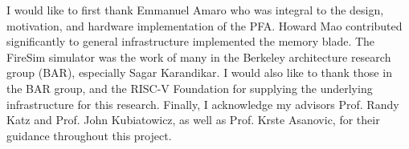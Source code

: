 I would like to first thank Emmanuel Amaro who was integral to the design,
motivation, and hardware implementation of the PFA. Howard Mao contributed
significantly to general infrastructure implemented the memory blade. The
FireSim simulator was the work of many in the Berkeley architecture research
group (BAR), especially Sagar Karandikar. I would also like to thank those in
the BAR group, and the RISC-V Foundation for supplying the underlying
infrastructure for this research.  Finally, I acknowledge my advisors Prof.
Randy Katz and Prof. John Kubiatowicz, as well as Prof. Krste Asanovic, for
their guidance throughout this project. 
